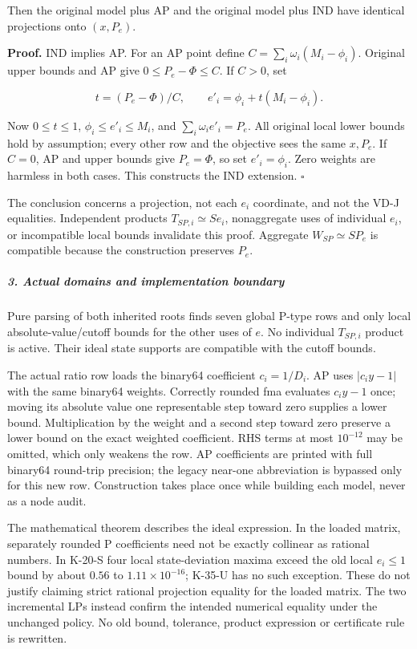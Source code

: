\documentclass[
  american,
  11pt,
]{article}
\begin{document}
Then the original model plus AP and the original model plus IND have
identical projections onto \((x,P_e)\).

\textbf{Proof.} IND implies AP. For an AP point define
\(C=\sum_i\omega_i(M_i-\phi_i)\). Original upper bounds and AP give
\(0\le P_e-\Phi\le C\). If \(C>0\), set

\[
t=(P_e-\Phi)/C,\qquad e'_i=\phi_i+t(M_i-\phi_i).
\]

Now \(0\le t\le1\), \(\phi_i\le e'_i\le M_i\), and
\(\sum_i\omega_i e'_i=P_e\). All original local lower bounds hold by
assumption; every other row and the objective sees the same \(x,P_e\).
If \(C=0\), AP and upper bounds give \(P_e=\Phi\), so set
\(e'_i=\phi_i\). Zero weights are harmless in both cases. This
constructs the IND extension. \(\square\)

The conclusion concerns a projection, not each \(e_i\) coordinate, and
not the VD-J equalities. Independent products \(T_{SP,i}\simeq Se_i\),
nonaggregate uses of individual \(e_i\), or incompatible local bounds
invalidate this proof. Aggregate \(W_{SP}\simeq SP_e\) is compatible
because the construction preserves \(P_e\).

\subparagraph{3. Actual domains and implementation
boundary}\label{actual-domains-and-implementation-boundary}

Pure parsing of both inherited roots finds seven global P-type rows and
only local absolute-value/cutoff bounds for the other uses of \(e\). No
individual \(T_{SP,i}\) product is active. Their ideal state supports
are compatible with the cutoff bounds.

The actual ratio row loads the binary64 coefficient \(c_i=1/D_i\). AP
uses \(|c_i y-1|\) with the same binary64 weights. Correctly rounded fma
evaluates \(c_i y-1\) once; moving its absolute value one representable
step toward zero supplies a lower bound. Multiplication by the weight
and a second step toward zero preserve a lower bound on the exact
weighted coefficient. RHS terms at most \(10^{-12}\) may be omitted,
which only weakens the row. AP coefficients are printed with full
binary64 round-trip precision; the legacy near-one abbreviation is
bypassed only for this new row. Construction takes place once while
building each model, never as a node audit.

The mathematical theorem describes the ideal expression. In the loaded
matrix, separately rounded P coefficients need not be exactly collinear
as rational numbers. In K-20-S four local state-deviation maxima exceed
the old local \(e_i\le1\) bound by about \(0.56\) to
\(1.11\times10^{-16}\); K-35-U has no such exception. These do not
justify claiming strict rational projection equality for the loaded
matrix. The two incremental LPs instead confirm the intended numerical
equality under the unchanged policy. No old bound, tolerance, product
expression or certificate rule is rewritten.
\end{document}
